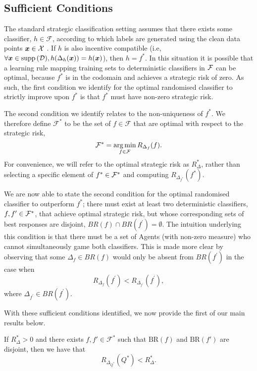 \subsection{Sufficient Conditions}
The standard strategic classification setting assumes that there exists some classifier, $h \in \mathcal{F}$, according to which labels are generated using the clean data points ${\bm{x}} \in \mathcal{X}$ \citep{hardt2016}. If $h$ is also incentive compatible (i.e, $\forall {\bm{x}} \in \textup{supp}\,({\mathcal{D}}), h(\Delta_h({\bm{x}})) = h({\bm{x}})$), then $h = f^\ast$. In this situation it is possible that a learning rule mapping training sets to deterministic classifiers in ${\mathcal{F}}$ can be optimal, because $f^\ast$ is in the codomain and achieves a strategic risk of zero. As such, the first condition we identify for the optimal randomised classifier to strictly improve upon $f^\ast$ is that $f^\ast$ must have non-zero strategic risk.

The second condition we identify relates to the non-uniqueness of $f^\ast$. We therefore define $\mathcal{F}^{\ast}$ to be the set of $f \in \mathcal{F}$ that are optimal with respect to the strategic risk,
\begin{equation}
    \mathcal{F}^{\ast} = \operatorname*{arg\,min}_{f \in \mathcal{F}} R_{\Delta_{f}}(f).
\end{equation}
For convenience, we will refer to the optimal strategic risk as $R_{\Delta}^{\ast}$, rather than selecting a specific element of $f^\ast \in {\mathcal{F}}^\ast$ and computing $R_{\Delta_{f^\ast}}(f^\ast)$.

We are now able to state the second condition for the optimal randomised classifier to outperform $f^{\ast}$; there must exist at least two deterministic classifiers, $f, f^\prime \in {\mathcal{F}}^\ast$, that achieve optimal strategic risk, but whose corresponding sets of best responses are disjoint, $BR(f) \cap BR(f^\prime) = \emptyset$. The intuition underlying this condition is that there must be a set of Agents (with non-zero measure) who cannot simultaneously game both classifiers. This is made more clear by observing that some $\Delta_f \in BR(f)$ would only be absent from $BR(f^\prime)$ in the case when
\begin{equation}
    R_{\Delta_f}(f^\prime) < R_{\Delta_{f^\prime}}(f^\prime),
\end{equation}
where $\Delta_{f^\prime} \in BR(f^\prime)$.

With these sufficient conditions identified, we now provide the first of our main results below.

\begin{theorem}
    If $R_\Delta^\ast > 0$ and there exists $f, f' \in \mathcal{F}^{\ast}$ such that $\text{BR}(f)$ and $\text{BR}(f')$ are disjoint, then we have that
    \begin{equation*}
        R_{\Delta_{Q^\ast}}(Q^\ast) < R_{\Delta}^\ast.
    \end{equation*}
    \label{thm:sufficient-conditions}
\end{theorem}

